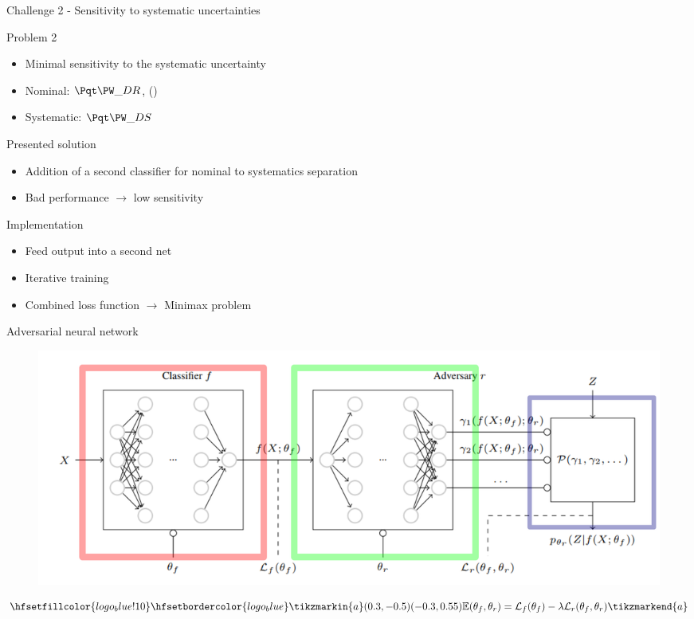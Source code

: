 \begin{frame}{Challenge 2 - Sensitivity to systematic uncertainties}
\begin{block}{Problem 2}
    \begin{itemize}
        \item Minimal sensitivity to the systematic uncertainty
        \item Nominal: $\tW\_DR$, (\ttbar)
        \item Systematic: $\tW\_DS$
    \end{itemize}
\end{block}
\begin{block}{Presented solution}
   \begin{itemize}
       \item Addition of a second classifier for nominal to systematics separation
       \item Bad performance $\longrightarrow$ low sensitivity
   \end{itemize}
\end{block}
\begin{block}{Implementation}
    \begin{itemize}
        \item Feed output into a second net
        \item Iterative training
        \item Combined loss function $\longrightarrow$ Minimax problem
    \end{itemize}
\end{block}
\end{frame}

\begin{frame}{Adversarial neural network}
\vspace{-0.3cm}
    \begin{figure}
        \centering
        \includegraphics[width=\textwidth]{figures_theory/ANN_paper.png}
        \caption{\cite{Louppe:2016ylz}}
    \end{figure}
    \begin{equation*}
        \hfsetfillcolor{logo_blue!10}
        \hfsetbordercolor{logo_blue}
        \tikzmarkin{a}(0.3,-0.5)(-0.3,0.55)
        \mathbb{E}(\theta_f, \theta_r) = \mathcal{L}_f(\theta_f) - \lambda \mathcal{L}_r(\theta_f, \theta_r)
        \tikzmarkend{a}
    \end{equation*}
\end{frame}

